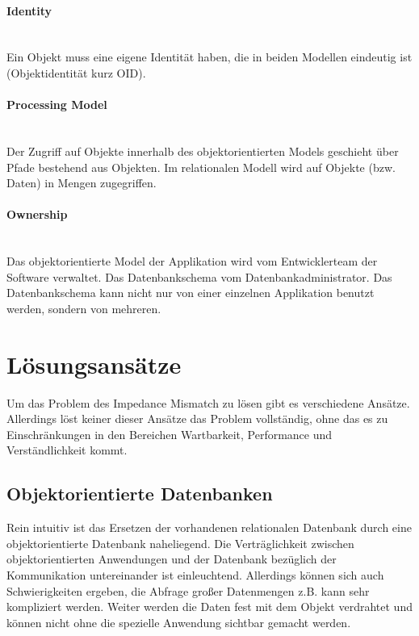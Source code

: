 \paragraph{Identity} \hspace{0pt} \\
Ein Objekt muss eine eigene Identität haben, die in beiden Modellen eindeutig ist (Objektidentität kurz OID). 

\paragraph{Processing Model} \hspace{0pt} \\
Der Zugriff auf Objekte innerhalb des objektorientierten Models geschieht über Pfade bestehend aus Objekten. Im relationalen Modell wird auf Objekte (bzw. Daten) in Mengen zugegriffen. 

\paragraph{Ownership} \hspace{0pt} \\
Das objektorientierte Model der Applikation wird vom Entwicklerteam der Software verwaltet. Das Datenbankschema vom Datenbankadministrator. Das Datenbankschema kann nicht nur von einer einzelnen Applikation benutzt werden, sondern von mehreren. 

\section{Lösungsansätze}

Um das Problem des Impedance Mismatch zu lösen gibt es verschiedene Ansätze. Allerdings löst keiner dieser Ansätze das Problem vollständig, ohne das es zu Einschränkungen in den Bereichen Wartbarkeit, Performance und Verständlichkeit kommt.

\subsection{Objektorientierte Datenbanken}

Rein intuitiv ist das Ersetzen der vorhandenen relationalen Datenbank durch eine objektorientierte Datenbank naheliegend. Die Verträglichkeit zwischen objektorientierten Anwendungen und der Datenbank bezüglich der Kommunikation untereinander ist einleuchtend. Allerdings können sich auch Schwierigkeiten ergeben, die Abfrage großer Datenmengen z.B. kann sehr kompliziert werden. Weiter werden die Daten fest mit dem Objekt verdrahtet und können nicht ohne die spezielle Anwendung sichtbar gemacht werden. 

